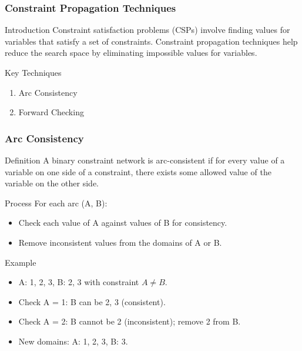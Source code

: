 \documentclass[aspectratio=169]{beamer}
\begin{document}
\begin{frame}[fragile]
    \frametitle{Constraint Propagation Techniques}
    \begin{block}{Introduction}
        Constraint satisfaction problems (CSPs) involve finding values for variables that satisfy a set of constraints. 
        Constraint propagation techniques help reduce the search space by eliminating impossible values for variables.
    \end{block}
    
    \begin{block}{Key Techniques}
        \begin{enumerate}
            \item Arc Consistency
            \item Forward Checking
        \end{enumerate}
    \end{block}
\end{frame}

\begin{frame}[fragile]
    \frametitle{Arc Consistency}
    \begin{block}{Definition}
        A binary constraint network is arc-consistent if for every value of a variable on one side of a constraint, 
        there exists some allowed value of the variable on the other side.
    \end{block}
    
    \begin{block}{Process}
        For each arc (A, B):
        \begin{itemize}
            \item Check each value of A against values of B for consistency.
            \item Remove inconsistent values from the domains of A or B.
        \end{itemize}
    \end{block}
    
    \begin{block}{Example}
        \begin{itemize}
            \item A: {1, 2, 3}, B: {2, 3} with constraint $A \neq B$.
            \item Check A = 1: B can be {2, 3} (consistent).
            \item Check A = 2: B cannot be 2 (inconsistent); remove 2 from B.
            \item New domains: A: {1, 2, 3}, B: {3}.
        \end{itemize}
    \end{block}
\end{frame}
\end{document}
